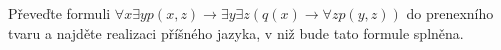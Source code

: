 Převeďte formuli $\forall x \exists y p(x,z) \rightarrow \exists y \exists
z(q(x)\rightarrow \forall z p(y,z))$ do prenexního tvaru a najděte realizaci
příšného jazyka, v niž bude tato formule splněna.
